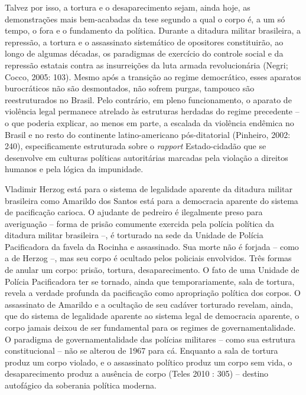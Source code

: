 Talvez por isso, a tortura e o desaparecimento sejam, ainda hoje, as
demonstrações mais bem-acabadas da tese segundo a qual o corpo é, a um
só tempo, o fora e o fundamento da política. Durante a ditadura militar
brasileira, a repressão, a tortura e o assassinato sistemático de
opositores constituirão, ao longo de algumas décadas, os paradigmas de
exercício do controle social e da repressão estatais contra as
insurreições da luta armada revolucionária (Negri; Cocco, 2005: 103).
Mesmo após a transição ao regime democrático, esses aparatos
burocráticos não são desmontados, não sofrem purgas, tampouco são
reestruturados no Brasil. Pelo contrário, em pleno funcionamento, o
aparato de violência legal permanece atrelado às estruturas herdadas do
regime precedente -- o que poderia explicar, ao menos em parte, a
escalada da violência endêmica no Brasil e no resto do continente
latino-americano pós-ditatorial (Pinheiro, 2002: 240), especificamente
estruturada sobre o \emph{rapport }Estado-cidadão que se desenvolve em
culturas políticas autoritárias marcadas pela violação a direitos
humanos e pela lógica da impunidade.

Vladimir Herzog está para o sistema de legalidade aparente da ditadura
militar brasileira como Amarildo dos Santos está para a democracia
aparente do sistema de pacificação carioca. O ajudante de pedreiro é
ilegalmente preso para averiguação -- forma de prisão comumente exercida
pela polícia política da ditadura militar brasileira --, é torturado na
sede da Unidade de Polícia Pacificadora da favela da Rocinha e
assassinado. Sua morte não é forjada -- como a de Herzog --, mas seu
corpo é ocultado pelos policiais envolvidos. Três formas de anular um
corpo: prisão, tortura, desaparecimento. O fato de uma Unidade de
Polícia Pacificadora ter se tornado, ainda que temporariamente, sala de
tortura, revela a verdade profunda da pacificação como apropriação
política dos corpos. O assassinato de Amarildo e a ocultação de seu
cadáver torturado revelam, ainda, que do sistema de legalidade aparente
ao sistema legal de democracia aparente, o corpo jamais deixou de ser
fundamental para os regimes de governamentalidade. O paradigma de
governamentalidade das polícias militares -- como sua estrutura
constitucional -- não se alterou de 1967 para cá. Enquanto a sala de
tortura produz um corpo violado, e o assassinato político produz um
corpo sem vida, o desaparecimento produz a ausência de corpo (Teles 2010
: 305) -- destino autofágico da soberania política moderna.


